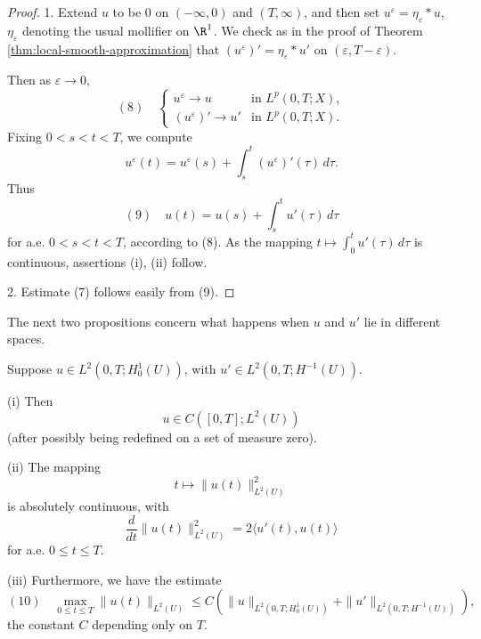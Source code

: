 \begin{proof}
1. Extend $u$ to be 0 on $(-\infty, 0)$ and $(T, \infty)$, and then set $u^\varepsilon = \eta_\varepsilon * u$, $\eta_\varepsilon$ denoting the usual mollifier on $\R^1$. We check as in the proof of Theorem \ref{thm:local-smooth-approximation} that $(u^\varepsilon)' = \eta_\varepsilon * u'$ on $(\varepsilon, T - \varepsilon)$.

Then as $\varepsilon \to 0$,
$$(8) \quad \begin{cases}
u^\varepsilon \to u & \text{in } L^p(0,T;X), \\
(u^\varepsilon)' \to u' & \text{in } L^p(0,T;X).
\end{cases}$$
Fixing $0 < s < t < T$, we compute
$$u^\varepsilon(t) = u^\varepsilon(s) + \int_s^t (u^\varepsilon)'(\tau) \, d\tau.$$
Thus
$$(9) \quad u(t) = u(s) + \int_s^t u'(\tau) \, d\tau$$
for a.e. $0 < s < t < T$, according to (8). As the mapping $t \mapsto \int_0^t u'(\tau) \, d\tau$ is continuous, assertions (i), (ii) follow.

2. Estimate (7) follows easily from (9).
\end{proof}

The next two propositions concern what happens when $u$ and $u'$ lie in different spaces.

\begin{theorem}
\label{thm:more-calculus-h1-hminus1}
Suppose $u \in L^2(0,T;H_0^1(U))$, with $u' \in L^2(0,T;H^{-1}(U))$.

(i) Then
$$u \in C([0,T];L^2(U))$$
(after possibly being redefined on a set of measure zero).

(ii) The mapping
$$t \mapsto \|u(t)\|^2_{L^2(U)}$$
is absolutely continuous, with
$$\frac{d}{dt}\|u(t)\|^2_{L^2(U)} = 2\langle u'(t), u(t)\rangle$$
for a.e. $0 \le t \le T$.

(iii) Furthermore, we have the estimate
$$(10) \quad \max_{0 \le t \le T} \|u(t)\|_{L^2(U)} \le C\left(\|u\|_{L^2(0,T;H_0^1(U))} + \|u'\|_{L^2(0,T;H^{-1}(U))}\right),$$
the constant $C$ depending only on $T$.
\end{theorem}

